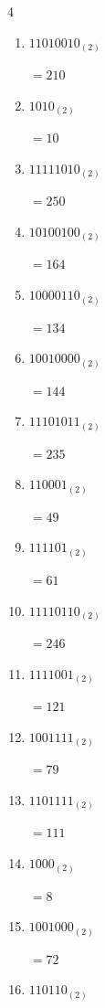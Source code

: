 \begin{multicols}{4}
\begin{enumerate}
        $=211$

  \item $11010010_{(2)}$

        $=210$

  \item $1010_{(2)}$

        $=10$

  \item $11111010_{(2)}$

        $=250$

  \item $10100100_{(2)}$

        $=164$

  \item $10000110_{(2)}$

        $=134$

\columnbreak %

\resetques

  \item $10010000_{(2)}$

        $=144$

  \item $11101011_{(2)}$

        $=235$

  \item $110001_{(2)}$

        $=49$

  \item $111101_{(2)}$

        $=61$

  \item $11110110_{(2)}$

        $=246$

  \item $1111001_{(2)}$

        $=121$

  \item $1001111_{(2)}$

        $=79$

  \item $1101111_{(2)}$

        $=111$

  \item $1000_{(2)}$

        $=8$

  \item $1001000_{(2)}$

        $=72$

  \item $110110_{(2)}$


\end{enumerate}
\end{multicols}
